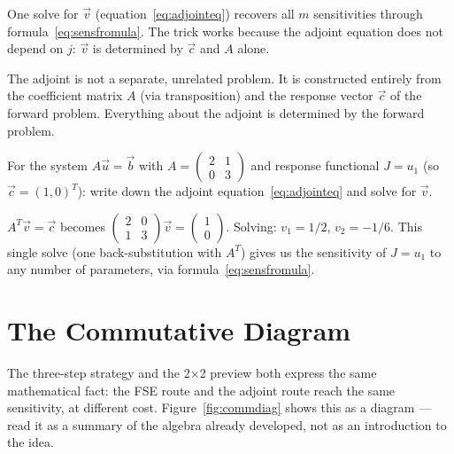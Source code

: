 One solve for $\vec{v}$ (equation~\eqref{eq:adjointeq}) recovers
all $m$ sensitivities through formula~\eqref{eq:sensfromula}.
The trick works because the adjoint equation does not depend on $j$:
$\vec{v}$ is determined by $\vec{c}$ and $A$ alone.

The adjoint is not a separate, unrelated problem. It is constructed
entirely from the coefficient matrix $A$ (via transposition)
and the response vector $\vec{c}$ of the forward problem.
Everything about the adjoint is determined by the forward problem.

\begin{selfcheck}
For the system $A\vec{u} = \vec{b}$ with
$A = \begin{pmatrix} 2 & 1 \\ 0 & 3 \end{pmatrix}$
and response functional $J = u_1$ (so $\vec{c} = (1,0)^T$):
write down the adjoint equation~\eqref{eq:adjointeq} and solve for $\vec{v}$.
\end{selfcheck}
\begin{scAnswer}
$A^T\vec{v} = \vec{c}$ becomes
$\begin{pmatrix} 2 & 0 \\ 1 & 3 \end{pmatrix}\vec{v}
= \begin{pmatrix} 1 \\ 0 \end{pmatrix}$.
Solving: $v_1 = 1/2$, $v_2 = -1/6$.
This single solve (one back-substitution with $A^T$) gives us the
sensitivity of $J = u_1$ to any number of parameters,
via formula~\eqref{eq:sensfromula}.
\end{scAnswer}

\section{The Commutative Diagram}
\label{sec:commdiagram}

The three-step strategy and the 2$\times$2 preview both express the same
mathematical fact: the FSE route and the adjoint route reach the same
sensitivity, at different cost.
Figure~\ref{fig:commdiag} shows this as a diagram —
read it as a summary of the algebra already developed,
not as an introduction to the idea.


